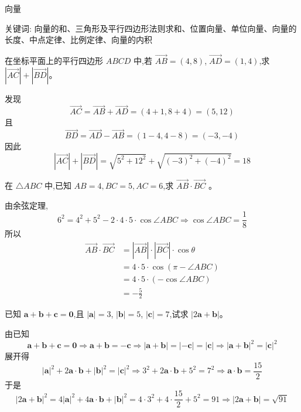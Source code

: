 \begin{center}
  {\fontsize{30pt}{26pt}\selectfont
    \hypertarget{向量}{向量} \label{向量}
  }
\end{center}
\separator
\begin{center}
    关键词: 向量的和、三角形及平行四边形法则求和、位置向量、单位向量、向量的长度、中点定律、比例定律、向量的内积
\end{center}
\vspace{0.5pt}

\begin{questions}
    \question 在坐标平面上的平行四边形 \(ABCD\) 中,若 \(\overrightarrow{AB} = (4,8)\),\(\;\overrightarrow{AD} = (1,4)\),求 $|\overrightarrow{AC}| + |\overrightarrow{BD}|$。
    \begin{solution}
        发现
        \[
        \overrightarrow{AC} = \overrightarrow{AB} + \overrightarrow{AD} = (4 + 1, 8 + 4) = (5,12)  
        \]
        且
        \[
        \overrightarrow{BD} = \overrightarrow{AD} - \overrightarrow{AB} = (1 - 4, 4 - 8) = (-3,-4)  
        \]
        因此
        \[
        |\overrightarrow{AC}| + |\overrightarrow{BD}| =\sqrt{5^2 + 12^2}+\sqrt{(-3)^2 + (-4)^2} = 18
        \]
    \end{solution}

    \question 在 \(\triangle ABC\) 中,已知 \(AB=4,BC=5,AC=6\),求 $\overrightarrow{AB} \cdot \overrightarrow{BC}$ 。
    \begin{solution}
    由余弦定理,
    \[
    6^2 = 4^2 + 5^2 - 2 \cdot 4 \cdot 5 \cdot \cos{\angle ABC}
    \Rightarrow \cos{\angle ABC} = \frac{1}{8}
    \]
    所以
    \begin{align*}
        \overrightarrow{AB} \cdot \overrightarrow{BC} &= |\overrightarrow{AB}| \cdot |\overrightarrow{BC}| \cdot \cos{\theta} \\
        &= 4 \cdot 5 \cdot \cos{(\pi - \angle ABC)} \\
        &= 4 \cdot 5 \cdot (-\cos{\angle ABC}) \\
        &= -\frac{5}{2}
    \end{align*}
    \end{solution}
    
    \question 已知 \(\mathbf{a} + \mathbf{b} + \mathbf{c} = \mathbf{0}\),且 \(|\mathbf{a}|=3\), \(|\mathbf{b}|=5\), \(|\mathbf{c}|=7\),试求 $|2\mathbf{a} + \mathbf{b}| $。
    \begin{solution}
        由已知
        \[
        \mathbf{a} + \mathbf{b} + \mathbf{c} = \mathbf{0}
        \Rightarrow \mathbf{a} + \mathbf{b} = -\mathbf{c} \Rightarrow |\mathbf{a} + \mathbf{b}| = |-\mathbf{c}| = |\mathbf{c}| \Rightarrow |\mathbf{a} + \mathbf{b}|^2 = |\mathbf{c}|^2
        \]
        展开得
        \[ |\mathbf{a}|^2 + 2\mathbf{a} \cdot \mathbf{b} + |\mathbf{b}|^2 = |\mathbf{c}|^2
        \Rightarrow 3^2 + 2\mathbf{a} \cdot \mathbf{b} + 5^2 = 7^2
        \Rightarrow \mathbf{a} \cdot \mathbf{b} = \frac{15}{2}
        \]
        于是
        \[
         |2\mathbf{a} + \mathbf{b}|^2 = 4|\mathbf{a}|^2 + 4\mathbf{a} \cdot \mathbf{b} + |\mathbf{b}|^2
        = 4 \cdot 3^2 + 4 \cdot \frac{15}{2} + 5^2 = 91
        \Rightarrow |2\mathbf{a} + \mathbf{b}| = \sqrt{91}
        \]
    \end{solution}


\end{questions}
